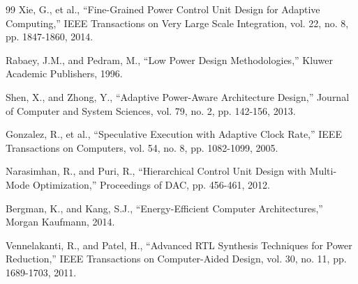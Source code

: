 \documentclass[15pt,a4paper]{report}
\begin{document}
\begin{thebibliography}{99}
Xie, G., et al., ``Fine-Grained Power Control Unit Design for Adaptive Computing,'' IEEE Transactions on Very Large Scale Integration, vol. 22, no. 8, pp. 1847-1860, 2014.

Rabaey, J.M., and Pedram, M., ``Low Power Design Methodologies,'' Kluwer Academic Publishers, 1996.

Shen, X., and Zhong, Y., ``Adaptive Power-Aware Architecture Design,'' Journal of Computer and System Sciences, vol. 79, no. 2, pp. 142-156, 2013.

Gonzalez, R., et al., ``Speculative Execution with Adaptive Clock Rate,'' IEEE Transactions on Computers, vol. 54, no. 8, pp. 1082-1099, 2005.

Narasimhan, R., and Puri, R., ``Hierarchical Control Unit Design with Multi-Mode Optimization,'' Proceedings of DAC, pp. 456-461, 2012.

Bergman, K., and Kang, S.J., ``Energy-Efficient Computer Architectures,'' Morgan Kaufmann, 2014.

Vennelakanti, R., and Patel, H., ``Advanced RTL Synthesis Techniques for Power Reduction,'' IEEE Transactions on Computer-Aided Design, vol. 30, no. 11, pp. 1689-1703, 2011.

\end{thebibliography}
\end{document}

